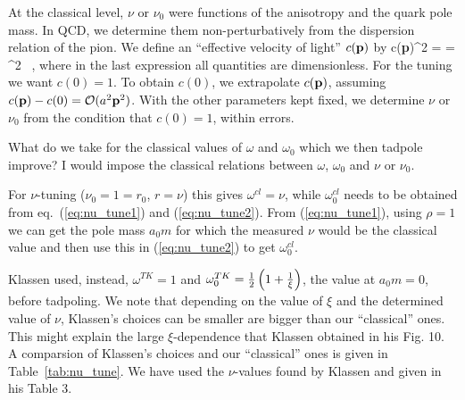 \documentclass[12pt]{article}
\begin{document}
At the classical level, $\nu$ or $\nu_0$ were functions of the anisotropy
and the quark pole mass. In QCD, we determine them non-perturbatively from
the dispersion relation of the pion. We define an ``effective velocity
of light'' $c({\bf p})$ by
\bea
c({\bf p})^2 = 
 = \xi^2  ~,
\eea
where in the last expression all quantities are dimensionless. For the
tuning we want $c(0)=1$. To obtain $c(0)$, we extrapolate $c({\bf p})$,
assuming $c({\bf p}) - c(0) = {\cal O}(a^2 {\bf p}^2)$. With the other
parameters kept fixed, we determine $\nu$ or $\nu_0$ from the condition
that $c(0)=1$, within errors.

What do we take for the classical values of $\omega$ and $\omega_0$ which
we then tadpole improve? I would impose the classical relations between
$\omega$, $\omega_0$ and $\nu$ or $\nu_0$.

For $\nu$-tuning ($\nu_0 = 1 = r_0$, $r = \nu$) this gives $\omega^{cl} = \nu$,
while $\omega^{cl}_0$ needs to be obtained from eq.~(\ref{eq:nu_tune1}) and
(\ref{eq:nu_tune2}). From (\ref{eq:nu_tune1}), using $\rho=1$ we can get
the pole mass $a_0 m$ for which the measured $\nu$ would be the classical
value and then use this in (\ref{eq:nu_tune2}) to get $\omega^{cl}_0$.

Klassen used, instead, $\omega^{TK} = 1$ and $\omega^{TK}_0 = \frac{1}{2}
\left( 1 + \frac{1}{\xi} \right)$, the value at $a_0 m = 0$, before
tadpoling. We note that depending on the value of $\xi$ and the determined
value of $\nu$, Klassen's choices can be smaller are bigger than our
``classical'' ones. This might explain the large $\xi$-dependence that
Klassen obtained in his Fig. 10. A comparsion of Klassen's choices and our
``classical'' ones is given in Table~\ref{tab:nu_tune}. We have used the
$\nu$-values found by Klassen and given in his Table 3.
\end{document}
